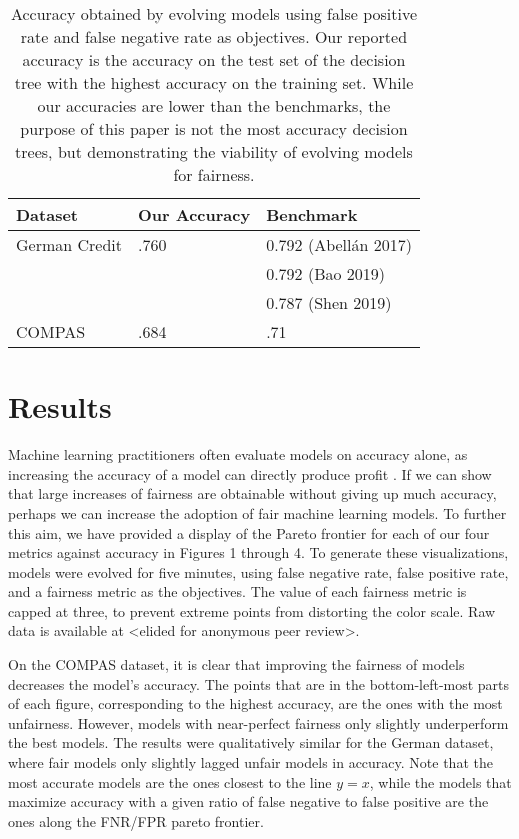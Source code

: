 \documentclass[twoside]{article}
\begin{document}
\renewcommand{\arraystretch}{1.5}
\begin{table}
	\begin{center}
	\begin{tabular}{| l | l | l |}
	\hline Dataset & Our Accuracy & Benchmark 
	\\ \hline German Credit & .760 & 0.792 (Abellán 2017)
	\\ & & 0.792 (Bao 2019)
	\\ & & 0.787 (Shen 2019) 
	\\ \hline COMPAS & .684 & .71 \citep{Larson:2016}
	\\ \hline
	\end{tabular}
	\end{center}
\caption{Accuracy obtained by evolving models using false positive rate and false negative rate as objectives. Our reported accuracy is the accuracy on the test set of the decision tree with the highest accuracy on the training set. While our accuracies are lower than the benchmarks, the purpose of this paper is not the most accuracy decision trees, but demonstrating the viability of evolving models for fairness.}
\label{table:name}
\end{table}

\section{Results}
Machine learning practitioners often evaluate models on accuracy alone, as increasing the accuracy of a model can directly produce profit \citep{Packer:2018}. If we can show that large increases of fairness are obtainable without giving up much accuracy, perhaps we can increase the adoption of fair machine learning models. To further this aim, we have provided a display of the Pareto frontier for each of our four metrics against accuracy in Figures 1 through 4. To generate these visualizations, models were evolved for five minutes, using false negative rate, false positive rate, and a fairness metric as the objectives. The value of each fairness metric is capped at three, to prevent extreme points from distorting the color scale. Raw data is available at <elided for anonymous peer review>. 

On the COMPAS dataset, it is clear that improving the fairness of models decreases the model’s accuracy. The points that are in the bottom-left-most parts of each figure, corresponding to the highest accuracy, are the ones with the most unfairness. However, models with near-perfect fairness only slightly underperform the best models. The results were qualitatively similar for the German dataset, where fair models only slightly lagged unfair models in accuracy. Note that the most accurate models are the ones closest to the line $ y = x $, while the models that maximize accuracy with a given ratio of false negative to false positive are the ones along the FNR/FPR pareto frontier.
\end{document}
